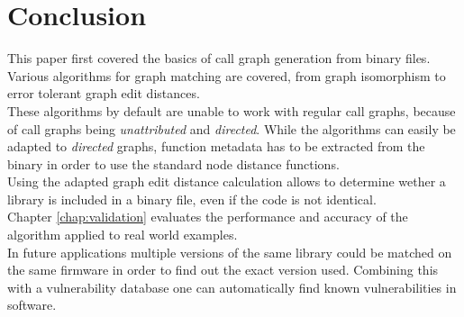 \documentclass[
    12pt,                               %
    DIV=14,                     %
    parskip=half+,              %
    bigheadings,                %
    cleardoubleempty,   %
    halfparskip,                %
    ]{scrreprt} %
\begin{document}
\chapter{Conclusion}
This paper first covered the basics of call graph generation from binary files. Various algorithms for graph matching are covered, from graph isomorphism to error tolerant graph edit distances. \\
These algorithms by default are unable to work with regular call graphs, because of call graphs being \textit{unattributed} and \textit{directed}. While the algorithms can easily be adapted to \textit{directed} graphs, function metadata has to be extracted from the binary in order to use the standard node distance functions. \\
Using the adapted graph edit distance calculation allows to determine wether a library is included in a binary file, even if the code is not identical. \\
Chapter \ref{chap:validation} evaluates the performance and accuracy of the algorithm applied to real world examples. \\
In future applications multiple versions of the same library could be matched on the same firmware in order to find out the exact version used. Combining this with a vulnerability database one can automatically find known vulnerabilities in software.
\end{document}
